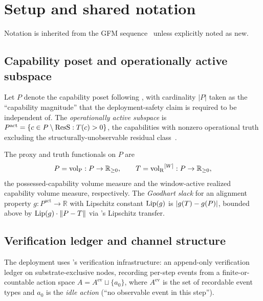 \section{Setup and shared notation}
\label{sec:setup}

Notation is inherited from the GFM
sequence~\citep{lasser2026micro,lasser2026paper8a,lasser2026paper8b,lasser2026exo,lasser2026paper10}
unless explicitly noted as new.

\subsection{Capability poset and operationally active subspace}

Let $P$ denote the capability poset following
\citep{lasser2026poset}, with cardinality $|P|$ taken as the
``capability magnitude'' that the deployment-safety claim is
required to be independent of. The \emph{operationally active
subspace} is $P^{\mathrm{act}} = \{c \in P \setminus
\mathrm{ResS} : T(c) > 0\}$, the capabilities with nonzero
operational truth excluding the structurally-unobservable
residual class~\citep{lasser2026micro}.

The proxy and truth functionals on $P$ are
\begin{equation}
  P = {\operatorname{vol}_{\mathrm{P}}} : P \to \mathbb{R}_{\geq 0}, \qquad
  T = {\operatorname{vol}_{\mathrm{R}}}^{[W]} : P \to \mathbb{R}_{\geq 0},
\end{equation}
the possessed-capability volume measure and the window-active
realized capability volume measure, respectively. The
\emph{Goodhart slack} for an alignment property
$g: P^{\mathrm{act}} \to \mathbb{R}$ with Lipschitz constant
$\mathrm{Lip}(g)$ is $|g(T) - g(P)|$, bounded above by
$\mathrm{Lip}(g) \cdot \|P - T\|$ via
\citep[Theorem~2]{lasser2026micro}'s Lipschitz transfer.

\subsection{Verification ledger and channel structure}

The deployment uses
\citep[Exogenous Verification]{lasser2026exo}'s verification
infrastructure: an append-only verification ledger on
substrate-exclusive nodes, recording per-step events from a
finite-or-countable action space $A = A^{\mathrm{ev}} \sqcup
\{a_0\}$, where $A^{\mathrm{ev}}$ is the set of recordable event
types and $a_0$ is the \emph{idle action} (``no observable event
in this step'').

